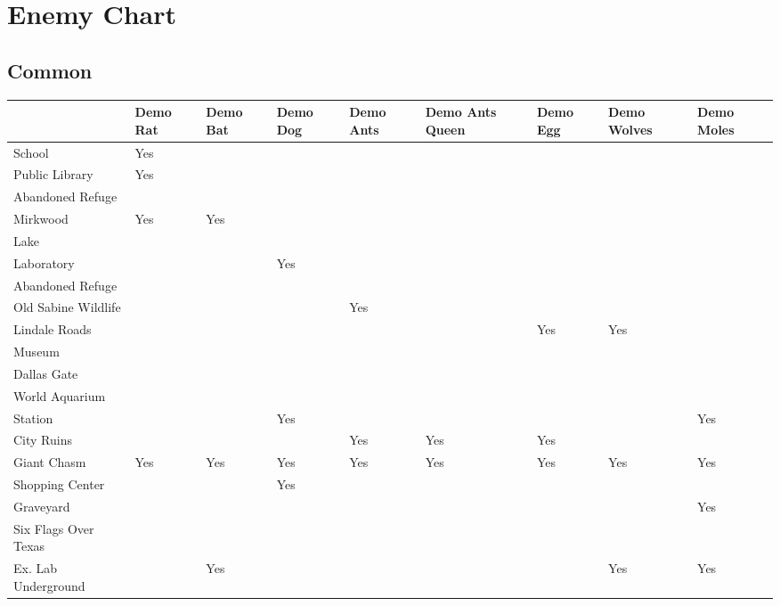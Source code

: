 \section{Enemy Chart}

\vspace*{0.2cm}

\subsection{Common}

\vspace*{0.2cm}

\begin{center}
	\begin{tabular}[c]{| p{3.8cm} | p{1cm} | p{1cm} | p{1cm} | p{1cm} | p{1.7cm} | p{1cm} | p{1cm} | p{1cm} | }
		\hline
								& Demo Rat	& Demo Bat	& Demo Dog	& Demo Ants	& Demo Ants Queen	& Demo Egg		& Demo Wolves	& Demo Moles	\\
		\hline
		School					& Yes		&			&	 		&	 		&					&				&		 		&				\\
		\hline
		Public Library	 		& Yes 		& 			& 			&			&					&				&				&				\\
		\hline
		Abandoned Refuge 		& 			&			&			&			&					&				&				&				\\
		\hline
		Mirkwood				& Yes 		& Yes		&			&			&					&				&				&				\\
		\hline
		Lake 					& 			&			&			&			&					&				&				&				\\
		\hline
		Laboratory 				& 			&			& Yes		&			&					&				&				&				\\
		\hline
		Abandoned Refuge 		& 			&			&			&			&					&				&				&				\\
		\hline
		Old Sabine Wildlife		& 			&			&			& Yes		&					&				&				&				\\
		\hline
		Lindale Roads			& 			&			&			&			&					& Yes			& Yes			&				\\
		\hline
 		Museum					& 			&			&			&			&					&				&				&				\\
		\hline
		Dallas Gate				&			&			&			&			&					&				&				&				\\
		\hline
		World Aquarium			& 			&			&			&			&					&				&				&				\\
		\hline
		Station					& 			&			& Yes		&			&					&				&				& Yes			\\
		\hline
		City Ruins				& 			&			& 			& Yes		& Yes				& Yes			& 				&				\\
		\hline \rowcolor{light-light-gray}
		Giant Chasm				& Yes 		& Yes		& Yes		& Yes		& Yes				& Yes			& Yes			& Yes			\\
		\hline
		Shopping Center 		& 			&			& Yes		&			&					&				&				&				\\
		\hline
		Graveyard				& 			&			&			&			&					&				&				& Yes			\\
		\hline
		Six Flags Over Texas	& 			&			&			&			&					&				&				&				\\
		\hline
		Ex. Lab Underground		&			& Yes		&			&			&					&				& Yes			& Yes			\\
		\hline
	\end{tabular}
\end{center}

